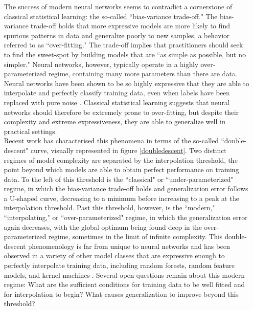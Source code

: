 \documentclass[a4paper, 12pt]{article}
\begin{document}
The success of modern neural networks seems to contradict a cornerstone of classical statistical learning: the so-called ``bias-variance trade-off." The bias-variance trade-off holds that more expressive models are more likely to find spurious patterns in data and generalize poorly to new samples, a behavior referred to as ``over-fitting." The trade-off implies that practitioners should seek to find the sweet-spot by building models that are ``as simple as possible, but no simpler." Neural networks, however, typically operate in a highly over-parameterized regime, containing many more parameters than there are data. Neural networks have been shown to be so highly expressive that they are able to interpolate and perfectly classify training data, even when labels have been replaced with pure noise \cite{zhangUnderstandingDeepLearning2017}. Classical statistical learning suggests that neural networks should therefore be extremely prone to over-fitting, but despite their complexity and extreme expressiveness, they are able to generalize well in practical settings.\\

Recent work \cite{belkinReconcilingModernMachine2019} has characterised this phenomena in terms of the so-called ``double-descent" curve, visually represented in figure \ref{doubledescent}. Two distinct regimes of model complexity are separated by the interpolation threshold, the point beyond which models are able to obtain perfect performance on training data. To the left of this threshold is the ``classical" or ``under-parameterized" regime, in which the bias-variance trade-off holds and generalization error follows a U-shaped curve, decreasing to a minimum before increasing to a peak at the interpolation threshold. Past this threshold, however, is the ``modern," ``interpolating," or ``over-parameterized" regime, in which the generalization error again decreases, with the global optimum being found deep in the over-parameterized regime, sometimes in the limit of infinite complexity. This double-descent phenomenology is far from unique to neural networks and has been observed in a variety of other model classes that are expressive enough to perfectly interpolate training data, including random forests, random feature models, and kernel machines \cite{ belkinReconcilingModernMachine2019, belkinUnderstandDeepLearning2018}. Several open questions remain about this modern regime: What are the sufficient conditions for training data to be well fitted and for interpolation to begin? What causes generalization to improve beyond this threshold?
\end{document}
